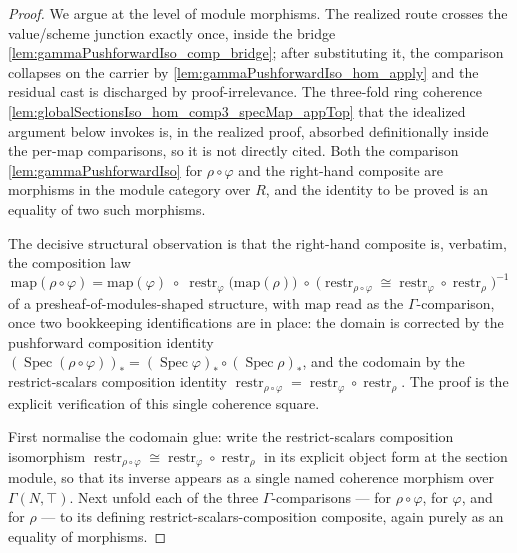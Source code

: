 \begin{proof}
  We argue at the level of module morphisms. The realized route crosses the value/scheme
  junction exactly once, inside the bridge \cref{lem:gammaPushforwardIso_comp_bridge}; after
  substituting it, the comparison collapses on the carrier by
  \cref{lem:gammaPushforwardIso_hom_apply} and the residual cast is discharged by
  proof-irrelevance. The three-fold ring coherence
  \cref{lem:globalSectionsIso_hom_comp3_specMap_appTop} that the idealized argument below
  invokes is, in the realized proof, absorbed definitionally inside the per-map comparisons,
  so it is not directly cited.
  Both the comparison \cref{lem:gammaPushforwardIso} for \(\rho\circ\varphi\) and
  the right-hand composite are morphisms in the module category over \(R\), and the
  identity to be proved is an equality of two such morphisms.

  The decisive structural observation is that the right-hand composite is, verbatim, the
  composition law
  \[
    \mathrm{map}(\rho\circ\varphi)
      = \mathrm{map}(\varphi)\;\circ\;
        \operatorname{restr}_\varphi\bigl(\mathrm{map}(\rho)\bigr)\;\circ\;
        \bigl(\operatorname{restr}_{\rho\circ\varphi} \cong
        \operatorname{restr}_\varphi\circ\operatorname{restr}_\rho\bigr)^{-1}
  \]
  of a presheaf-of-modules-shaped structure, with \(\mathrm{map}\) read as the
  \(\Gamma\)-comparison, once two bookkeeping identifications are in place: the domain is
  corrected by the pushforward composition identity
  \((\operatorname{Spec}(\rho\circ\varphi))_* = (\operatorname{Spec}\varphi)_* \circ
  (\operatorname{Spec}\rho)_*\), and the codomain by the restrict-scalars composition
  identity \(\operatorname{restr}_{\rho\circ\varphi} = \operatorname{restr}_\varphi \circ
  \operatorname{restr}_\rho\). The proof is the explicit verification of this single
  coherence square.

  First normalise the codomain glue: write the restrict-scalars composition isomorphism
  \(\operatorname{restr}_{\rho\circ\varphi} \cong \operatorname{restr}_\varphi \circ
  \operatorname{restr}_\rho\) in its explicit object form at the section module, so that
  its inverse appears as a single named coherence morphism over \(\Gamma(N,\top)\). Next
  unfold each of the three \(\Gamma\)-comparisons — for \(\rho\circ\varphi\), for
  \(\varphi\), and for \(\rho\) — to its defining restrict-scalars-composition composite,
  again purely as an equality of morphisms.


\end{proof}

